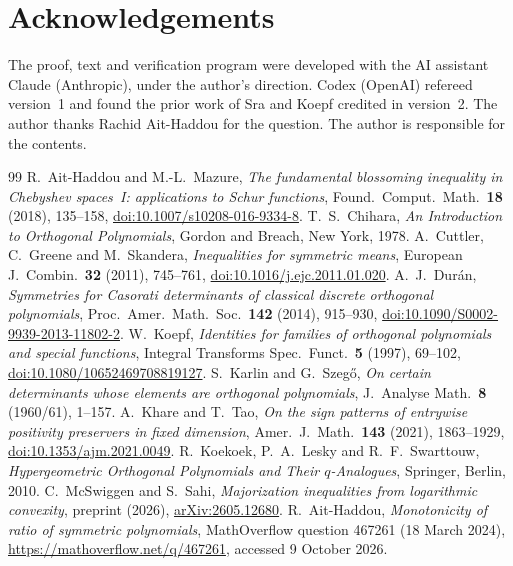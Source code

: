 \documentclass[11pt]{amsart}
\theoremstyle{remark}
\begin{document}
\section*{Acknowledgements}
The proof, text and verification program were developed with the AI assistant Claude (Anthropic), under the author's direction. Codex (OpenAI) refereed version~1 and found the prior work of Sra and Koepf credited in version~2. The author thanks Rachid Ait-Haddou for the question. The author is responsible for the contents.

\begin{thebibliography}{99}
 R.~Ait-Haddou and M.-L.~Mazure, \emph{The fundamental blossoming inequality in Chebyshev spaces~I: applications to Schur functions}, Found.\ Comput.\ Math.\ \textbf{18} (2018), 135--158, \href{https://doi.org/10.1007/s10208-016-9334-8}{doi:10.1007/s10208-016-9334-8}.
 T.~S.~Chihara, \emph{An Introduction to Orthogonal Polynomials}, Gordon and Breach, New York, 1978.
 A.~Cuttler, C.~Greene and M.~Skandera, \emph{Inequalities for symmetric means}, European J.\ Combin.\ \textbf{32} (2011), 745--761, \href{https://doi.org/10.1016/j.ejc.2011.01.020}{doi:10.1016/j.ejc.2011.01.020}.
 A.~J.~Dur\'an, \emph{Symmetries for Casorati determinants of classical discrete orthogonal polynomials}, Proc.\ Amer.\ Math.\ Soc.\ \textbf{142} (2014), 915--930, \href{https://doi.org/10.1090/S0002-9939-2013-11802-2}{doi:10.1090/S0002-9939-2013-11802-2}.
 W.~Koepf, \emph{Identities for families of orthogonal polynomials and special functions}, Integral Transforms Spec.\ Funct.\ \textbf{5} (1997), 69--102, \href{https://doi.org/10.1080/10652469708819127}{doi:10.1080/10652469708819127}.
 S.~Karlin and G.~Szeg\H{o}, \emph{On certain determinants whose elements are orthogonal polynomials}, J.\ Analyse Math.\ \textbf{8} (1960/61), 1--157.
 A.~Khare and T.~Tao, \emph{On the sign patterns of entrywise positivity preservers in fixed dimension}, Amer.\ J.\ Math.\ \textbf{143} (2021), 1863--1929, \href{https://doi.org/10.1353/ajm.2021.0049}{doi:10.1353/ajm.2021.0049}.
 R.~Koekoek, P.~A.~Lesky and R.~F.~Swarttouw, \emph{Hypergeometric Orthogonal Polynomials and Their $q$-Analogues}, Springer, Berlin, 2010.
 C.~McSwiggen and S.~Sahi, \emph{Majorization inequalities from logarithmic convexity}, preprint (2026), \href{https://arxiv.org/abs/2605.12680}{arXiv:2605.12680}.
 R.~Ait-Haddou, \emph{Monotonicity of ratio of symmetric polynomials}, MathOverflow question 467261 (18 March 2024), \url{https://mathoverflow.net/q/467261}, accessed 9 October 2026.

\end{thebibliography}
\end{document}
